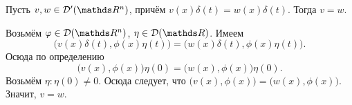 \begin{Task}
  Пусть $v,w\in\D'(\R^n)$, причём $v(x)\delta(t) = w(x)\delta(t)$. Тогда $v=w$.
\end{Task}
\begin{Solution}
Возьмём $\phi\in\D(\R^n)$, $\eta\in\D(\R)$. Имеем
\[
  \big(v(x)\delta(t),\phi(x)\eta(t)\big) = 
  \big(w(x)\delta(t),\phi(x)\eta(t)\big).
\]
Осюда по определению
\[
  \big(v(x),\phi(x)\big)\eta(0) = \big(w(x),\phi(x)\big)\eta(0).
\]
Возьмём $\eta\colon \eta(0)\ne0$. Осюда следует, что $\big(v(x),\phi(x)\big) = \big(w(x),\phi(x)\big)$. Значит, $v=w$.
\end{Solution}
